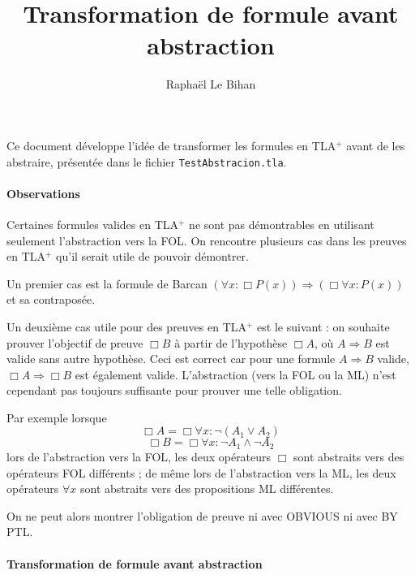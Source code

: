 \documentclass[12pt]{article}
\title{Transformation de formule avant abstraction}
\author{Raphaël Le Bihan}
\begin{document}
\maketitle

Ce document développe l'idée de transformer les formules en TLA$^+$ avant de les abstraire, présentée dans le fichier \texttt{TestAbstracion.tla}.

\paragraph{Observations}

Certaines formules valides en TLA$^+$ ne sont pas démontrables en utilisant seulement l'abstraction vers la FOL.
On rencontre plusieurs cas dans les preuves en TLA$^+$ qu'il serait utile de pouvoir démontrer.

Un premier cas est la formule de Barcan $(\forall x : \Box P(x)) \Rightarrow (\Box \forall x : P(x))$ et sa contraposée.

Un deuxième cas utile pour des preuves en TLA$^+$ est le suivant :
on souhaite prouver l'objectif de preuve $\Box B$ à partir de l'hypothèse $\Box A$, où $A \Rightarrow B$ est valide sans autre hypothèse.
Ceci est correct car pour une formule $A \Rightarrow B$ valide, $\Box A \Rightarrow \Box B$ est également valide.
L'abstraction (vers la FOL ou la ML) n'est cependant pas toujours suffisante pour prouver une telle obligation.

Par exemple lorsque
\[ \Box A = \Box \forall x : \neg (A_1 \lor A_2) \]
\[ \Box B = \Box \forall x : \neg A_1 \land \neg A_2\]
lors de l'abstraction vers la FOL, les deux opérateurs $\Box$ sont abstraits vers des opérateurs FOL différents ; de même lors de l'abstraction vers la ML, les deux opérateurs $\forall x$ sont abstraits vers des propositions ML différentes.

On ne peut alors montrer l'obligation de preuve ni avec OBVIOUS ni avec BY PTL.

\begin{comment}
Remarque : Ici on raisonnera sur des formules TLA$^+$ et pas sur des formules FOML.
Dans la FOML l'interprétation du symbole $\nabla$ n'est pas connue,
les transformations que l'on peut effectuer sur une formule FOML tout
en gardant des formules équivalentes sont donc moindres par rapport aux transformations sur les formules TLA$^+$.
\end{comment}

\paragraph{Transformation de formule avant abstraction}
\end{document}
